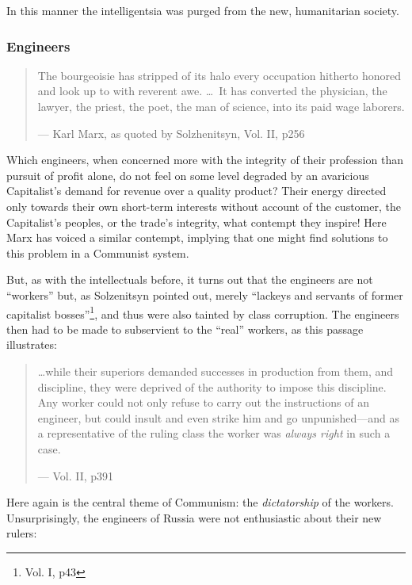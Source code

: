\documentclass{article}
\begin{document}
In this manner the intelligentsia was purged from the new, humanitarian society.

\subsubsection{Engineers}
\begin{quote}
The bourgeoisie has stripped of its halo every occupation hitherto honored and look up to with reverent awe.  \ldots~It has converted the physician, the lawyer, the priest, the poet, the man of science, into its paid wage laborers.

--- Karl Marx, as quoted by Solzhenitsyn, Vol. II, p256
\end{quote}

Which engineers, when concerned more with the integrity of their profession than pursuit of profit alone, do not feel on some level degraded by an avaricious Capitalist's demand for revenue over a quality product?  Their energy directed only towards their own short-term interests without account of the customer, the Capitalist's peoples, or the trade's integrity, what contempt they inspire!  Here Marx has voiced a similar contempt, implying that one might find solutions to this problem in a Communist system.

But, as with the intellectuals before, it turns out that the engineers are not ``workers'' but, as Solzenitsyn pointed out, merely ``lackeys and servants of former capitalist bosses''\footnote{Vol. I, p43}, and thus were also tainted by class corruption.  The engineers then had to be made to subservient to the ``real'' workers, as this passage illustrates:

\begin{quote}
\ldots while their superiors demanded successes in production from them, and discipline, they were deprived of the authority to impose this discipline.  Any worker could not only refuse to carry out the instructions of an engineer, but could insult and even strike him and go unpunished---and as a representative of the ruling class the worker was \emph{always right} in such a case.

--- Vol. II, p391
\end{quote}

Here again is the central theme of Communism: the \emph{dictatorship} of the workers.  Unsurprisingly, the engineers of Russia were not enthusiastic about their new rulers:
\end{document}
